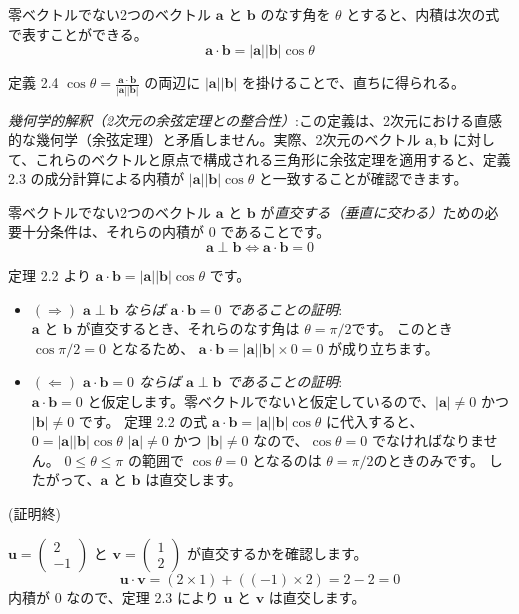 \begin{thm}[内積とベクトルのなす角の関係]
零ベクトルでない2つのベクトル $\bm{a}$ と $\bm{b}$ のなす角を $\theta$ とすると、内積は次の式で表すことができる。
\[\bm{a} \cdot \bm{b} = |\bm{a}| |\bm{b}| \cos\theta\]
\begin{proof*}
定義 2.4 $\cos\theta = \frac{\bm{a} \cdot \bm{b}}{|\bm{a}| |\bm{b}|}$ の両辺に $|\bm{a}| |\bm{b}|$ を掛けることで、直ちに得られる。
\end{proof*}
\end{thm}
\emph{幾何学的解釈（2次元の余弦定理との整合性）}:この定義は、2次元における直感的な幾何学（余弦定理）と矛盾しません。実際、2次元のベクトル $\bm{a}, \bm{b}$ に対して、これらのベクトルと原点で構成される三角形に余弦定理を適用すると、定義 2.3 の成分計算による内積が $|\bm{a}||\bm{b}|\cos\theta$ と一致することが確認できます。

\begin{thm}[ベクトルの直交条件]
零ベクトルでない2つのベクトル $\bm{a}$ と $\bm{b}$ が\emph{直交する（垂直に交わる）}ための必要十分条件は、それらの内積が $0$ であることです。
\[\bm{a} \perp \bm{b} \iff \bm{a} \cdot \bm{b} = 0\]
\begin{proof*}
定理 2.2 より $\bm{a} \cdot \bm{b} = |\bm{a}| |\bm{b}| \cos\theta$ です。
\begin{itemize}
\item \emph{$(\Rightarrow)$ $\bm{a} \perp \bm{b}$ ならば $\bm{a} \cdot \bm{b} = 0$ であることの証明}:\\
    $\bm{a}$ と $\bm{b}$ が直交するとき、それらのなす角は $\theta = \pi/2$です。
    このとき $\cos \pi/2 = 0$ となるため、
    $\bm{a} \cdot \bm{b} = |\bm{a}| |\bm{b}| \times 0 = 0$
    が成り立ちます。
\item \emph{$(\Leftarrow)$ $\bm{a} \cdot \bm{b} = 0$ ならば $\bm{a} \perp \bm{b}$ であることの証明}:\\
    $\bm{a} \cdot \bm{b} = 0$ と仮定します。零ベクトルでないと仮定しているので、$|\bm{a}| \neq 0$ かつ $|\bm{b}| \neq 0$ です。
    定理 2.2 の式 $\bm{a} \cdot \bm{b} = |\bm{a}| |\bm{b}| \cos\theta$ に代入すると、
    $0 = |\bm{a}| |\bm{b}| \cos\theta$
    $|\bm{a}| \neq 0$ かつ $|\bm{b}| \neq 0$ なので、$\cos\theta = 0$ でなければなりません。
    $0 \le \theta \le \pi$ の範囲で $\cos\theta = 0$ となるのは $\theta = \pi/2$のときのみです。
    したがって、$\bm{a}$ と $\bm{b}$ は直交します。
\end{itemize}
(証明終)
\end{proof*}
\end{thm}
\begin{ex}
$\bm{u} = \begin{pmatrix} 2 \\ -1 \end{pmatrix}$ と $\bm{v} = \begin{pmatrix} 1 \\ 2 \end{pmatrix}$ が直交するかを確認します。
\[\bm{u} \cdot \bm{v} = (2 \times 1) + ((-1) \times 2) = 2 - 2 = 0\]
内積が $0$ なので、定理 2.3 により $\bm{u}$ と $\bm{v}$ は直交します。
\end{ex}

